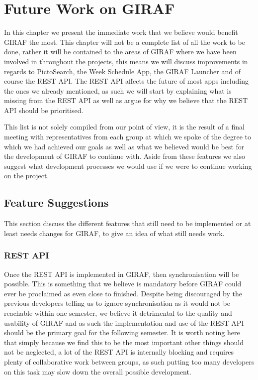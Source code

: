 \chapter{Future Work on GIRAF}\label{chp:futureworks}
In this chapter we present the immediate work that we believe would benefit GIRAF the most.
This chapter will not be a complete list of all the work to be done, rather it will be contained to the areas of GIRAF where we have been involved in throughout the projects, this means we will discuss improvements in regards to PictoSearch, the Week Schedule App, the GIRAF Launcher and of course the REST API.
The REST API affects the future of most apps including the ones we already mentioned, as such we will start by explaining what is missing from the REST API as well as argue for why we believe that the REST API should be prioritised.

This list is not solely compiled from our point of view, it is the result of a final meeting with representatives from each group at which we spoke of the degree to which we had achieved our goals as well as what we believed would be best for the development of GIRAF to continue with.
Aside from these features we also suggest what development processes we would use if we were to continue working on the project.

\section{Feature Suggestions}
This section discuss the different features that still need to be implemented or at least needs changes for GIRAF, to give an idea of what still needs work.

\subsection*{REST API}
Once the REST API is implemented in GIRAF, then synchronisation will be possible.
This is something that we believe is mandatory before GIRAF could ever be proclaimed as even close to finished.
Despite being discouraged by the previous developers telling us to ignore synchronisation as it would not be reachable within one semester, we believe it detrimental to the quality and usability of GIRAF and as such the implementation and use of the REST API should be the primary goal for the following semester.
It is worth noting here that simply because we find this to be the most important other things should not be neglected, a lot of the REST API is internally blocking and requires plenty of collaborative work between groups, as such putting too many developers on this task may slow down the overall possible development.

